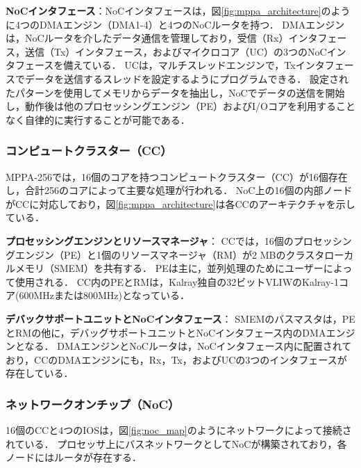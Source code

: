 \documentclass[submit,techrep]{ipsj_v2/UTF8/ipsj}
\begin{document}
\textbf{NoCインタフェース}：NoCインタフェースは，図\ref{fig:mppa_architecture}のように4つのDMAエンジン（DMA1-4）と4つのNoCルータを持つ．
DMAエンジンは，NoCルータを介したデータ通信を管理しており，受信（Rx）インタフェース，送信（Tx）インタフェース，およびマイクロコア（UC）の3つのNoCインタフェースを備えている．
UCは，マルチスレッドエンジンで，Txインタフェースでデータを送信するスレッドを設定するようにプログラムできる．
設定されたパターンを使用してメモリからデータを抽出し，NoCでデータの送信を開始し，動作後は他のプロセッシングエンジン（PE）およびI/Oコアを利用することなく自律的に実行することが可能である．

\subsubsection{コンピュートクラスター（CC）}
\label{sec:cc}
MPPA-256では，16個のコアを持つコンピュートクラスター（CC）が16個存在し，合計256のコアによって主要な処理が行われる．
NoC上の16個の内部ノードがCCに対応しており，図\ref{fig:mppa_architecture}は各CCのアーキテクチャを示している．

\textbf{プロセッシングエンジンとリソースマネージャ}：
CCでは，16個のプロセッシングエンジン（PE）と1個のリソースマネージャ（RM）が2 MBのクラスタローカルメモリ（SMEM）を共有する．
PEは主に，並列処理のためにユーザーによって使用される．
CC内のPEとRMは，Kalray独自の32ビットVLIWのKalray-1コア(600MHzまたは800MHz)となっている．

\textbf{デバックサポートユニットとNoCインタフェース}：
SMEMのバスマスタは，PEとRMの他に，デバッグサポートユニットとNoCインタフェース内のDMAエンジンとなる．
DMAエンジンとNoCルータは，NoCインタフェース内に配置されており，CCのDMAエンジンにも，Rx，Tx，およびUCの3つのインタフェースが存在している．

\subsubsection{ネットワークオンチップ（NoC）}
\label{sec:noc}
16個のCCと4つのIOSは，図\ref{fig:noc_map}のようにネットワークによって接続されている．
プロセッサ上にバスネットワークとしてNoCが構築されており，各ノードにはルータが存在する．
\end{document}

